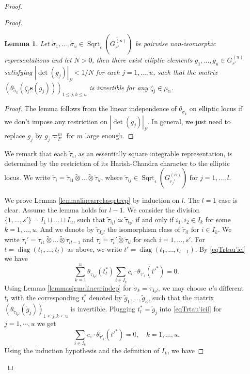 \documentclass{amsart}
\numberwithin{equation}{section}
\newtheorem{lemma}[theorem]{\bf{Lemma}}
\newcommand{\abs}[1]{\left|#1\right|_{F}}
\newcommand{\mrdet}{\operatorname{det}}
\newcommand{\mrdiag}{\operatorname{diag}}
\newcommand{\mrsqrt}{\operatorname{Sqrt}}
\newcommand{\bs}[1]{\boldsymbol{#1}}
\newcommand{\wt}[1]{\widetilde{#1}}
\begin{document}
\begin{proof}
\begin{proof}
\begin{lemma}
				Let $\wt{\sigma}_{1},\dots,\wt{\sigma}_{u}\in\mrsqrt_{\epsilon}(\wt{G_{r'}^{(n)}})$ be pairwise non-isomorphic representations and let $N>0$, then there exist elliptic elements $g_{1},\dots,g_{u}\in G_{r'}^{(n)}$  satisfying $\abs{\mrdet(g_{j})}<1/N$ for each $j=1,\dots, u$, such that the matrix $(\theta_{\wt{\sigma}_{k}}(\zeta_{j}\bs{s}(g_{j})))_{1\leq j,k\leq u}$ is invertible for any $\zeta_{j}\in\mu_{n}$.
				
			\end{lemma}
			
			\begin{proof}
				
				The lemma follows from the linear independence of $\theta_{\wt{\sigma}_{k}}$ on elliptic locus if we don't impose any restriction on $\abs{\mrdet(g_{j})}$. In general, we just need to replace $g_{j}$ by $g_{j}\varpi_{F}^{m}$ for $m$ large enough.
				
			\end{proof}
			
			We remark that each $\wt{\tau}_{i}$, as an essentially square integrable representation, is determined by the restriction of its Harish-Chandra character to the elliptic locus. We write $\wt{\tau}_{i}=\wt{\tau}_{i1}\wt{\otimes}\dots\wt{\otimes}\wt{\tau}_{il}$, where $\wt{\tau}_{ij}\in\mrsqrt_{\epsilon}(\wt{G_{r_{j}'}^{(n)}})$ for $j=1,\dots,l$. 
			
			We prove Lemma \ref{lemmalinearrelasqrtrep} by induction on $l$. The $l=1$ case is clear. Assume the lemma holds for $l-1$. We consider the division $\{1,\dots,s'\}=I_{1}\sqcup\dots\sqcup I_{u}$, such that $\wt{\tau}_{i_{1}l}\simeq\wt{\tau}_{i_{2}l}$ if and only if $i_{1},i_{2}\in I_{k}$ for some $k=1,\dots,u$. And we denote by $\wt{\tau}_{I_{k}l}$ the isomorphism class of $\wt{\tau}_{il}$ for $i\in I_{k}$. We write $\wt{\tau}_{i}'=\wt{\tau}_{i1}\wt{\otimes}\dots\wt{\otimes}\wt{\tau}_{il-1}$ and $\wt{\tau}_{i}=\wt{\tau}_{i}'\wt{\otimes}\wt{\tau}_{il}$ for each $i=1,\dots, s'$. For $t=\mrdiag(t_{1},\dots,t_{l})$ as above, we write $t'=\mrdiag(t_{1},\dots,t_{l-1})$. By \eqref{eqTrtau'ici} we have
			\begin{equation}\label{eqTrtau'icil}
				\sum_{k=1}^{u}\theta_{\wt{\tau}_{I_{k}l}}(t_{l}^{*})\sum_{i\in I_{k}}c_{i}\cdot\theta_{\wt{\tau}'_{i}}(t'^{*})=0.
			\end{equation}
			Using Lemma \ref{lemmasigmalinearindep} for $\wt{\sigma}_{k}=\wt{\tau}_{I_{k}l}$, we may choose $u$'s different $t_{l}$ with the corresponding $t_{l}^{*}$ denoted by $\wt{g}_{1},\dots,\wt{g}_{u}$, such that the matrix $(\theta_{\wt{\tau}_{I_{k}l}}(\wt{g}_{j}))_{1\leq j,k\leq u}$ is invertible. Plugging $t_{l}^{*}=\wt{g}_{j}$ into \eqref{eqTrtau'icil} for $j=1,\cdots, u$ we get
			$$\sum_{i\in I_{k}}c_{i}\cdot\theta_{\wt{\tau}'_{i}}(t'^{*})=0,\quad k=1,\dots,u.$$
			Using the induction hypothesis and the definition of $I_{k}$, we have
			

\end{proof}
\end{proof}
\end{document}
